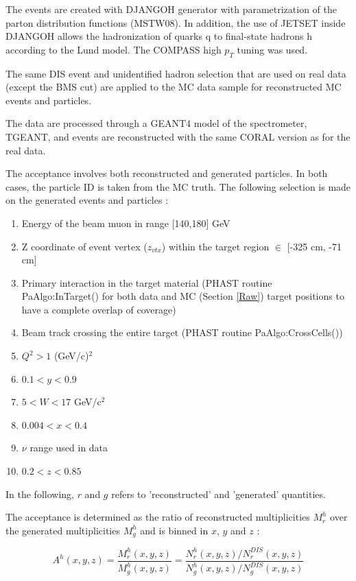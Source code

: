 \documentclass[letterpaper,12pt]{article}
\begin{document}
The events are created with DJANGOH generator with parametrization of the parton distribution functions
(MSTW08). In addition, the use of JETSET inside DJANGOH allows the hadronization of quarks q to final-state
hadrons h according to the Lund model. The COMPASS high $p_T$ tuning was used.

The same DIS event and unidentified hadron selection that are used on real data (except the BMS cut) are applied
to the MC data sample for reconstructed MC events and particles.

The data are processed through a GEANT4 model of the spectrometer, TGEANT, and events are reconstructed with the
same CORAL version as for the real data.

The acceptance involves both reconstructed and generated particles. In both cases, the particle ID is taken from
the MC truth. The following selection is made on the generated events and particles :

\begin{enumerate}
  \item Energy of the beam muon in range [140,180] GeV
	\item Z coordinate of event vertex ($z_{vtx}$) within the target region $\in$ [-325 cm, -71 cm]
	\item Primary interaction in the target material (PHAST routine PaAlgo:InTarget() for both data and MC (Section \ref{Raw}) target positions
				to have a complete overlap of coverage)
	\item Beam track crossing the entire target (PHAST routine PaAlgo:CrossCells())
  \item $Q^2>1$ (GeV/c)$^2$
  \item $0.1 < y < 0.9$
	\item $5 < W < 17$ GeV/c$^2$
  \item $0.004 < x < 0.4$
  \item $\nu$ range used in data
  \item $0.2 < z < 0.85$
\end{enumerate}

In the following, $r$ and $g$ refers to 'reconstructed' and 'generated' quantities.

The acceptance is determined as the ratio of reconstructed multiplicities $M^h_r$ over the generated multiplicities $M^h_g$
and is binned in $x$, $y$ and $z$ :

\begin{equation}
  A^h(x,y,z) = \frac{M^h_r(x,y,z)}{M^h_g(x,y,z)}=\frac{N^h_r(x,y,z)/N^{DIS}_r(x,y,z)}{N^h_g(x,y,z)/N^{DIS}_g(x,y,z)}
\end{equation}
\end{document}
